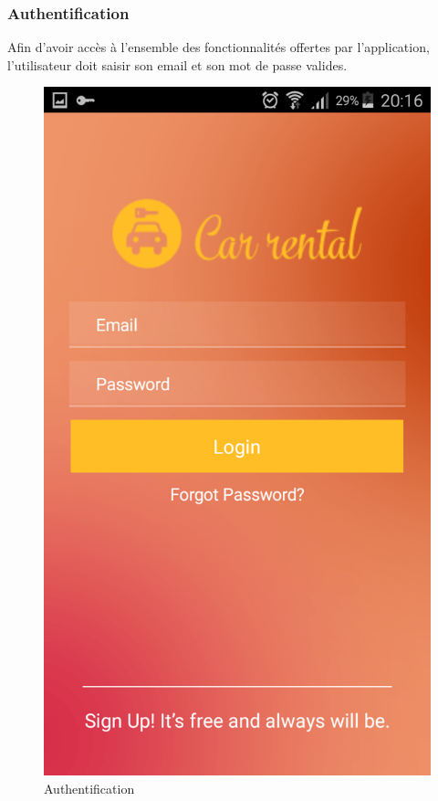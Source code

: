 \documentclass[12pt,a4paper]{report}
\begin{document}
	\subsubsection{Authentification}
Afin d’avoir accès à l’ensemble des fonctionnalités offertes par l’application, l’utilisateur doit
saisir son email et son mot de passe valides.
	\vspace{2cm}
	\begin{figure}[!hbtp]
		\centering
		\includegraphics[scale=0.2]{./graphics/Signin.png}
		\caption{Authentification}
		\end{figure}
		\newpage
	
\end{document}

